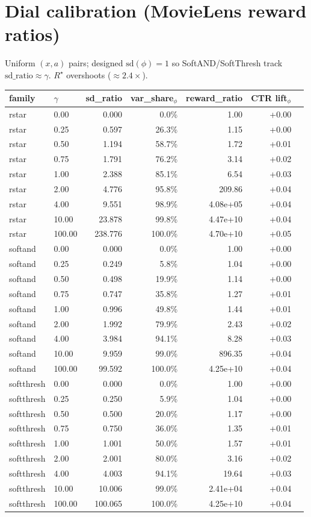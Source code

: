\documentclass[10pt,a4paper]{article}
\begin{document}
\section{Dial calibration (MovieLens reward ratios)}
Uniform $(x,a)$ pairs; designed $\mathrm{sd}(\phi)=1$ so SoftAND/SoftThresh track $\mathrm{sd\_ratio}\approx\gamma$. $R^\star$ overshoots ($\approx 2.4\times$).
\begin{center}\small\begin{tabular}{llrrrrr}
\toprule family & $\gamma$ & sd\_ratio & var\_share$_\phi$ & reward\_ratio & CTR lift$_\phi$ \\
\midrule
rstar & 0.00 & 0.000 & 0.0\% & 1.00 & +0.00 \\
rstar & 0.25 & 0.597 & 26.3\% & 1.15 & +0.00 \\
rstar & 0.50 & 1.194 & 58.7\% & 1.72 & +0.01 \\
rstar & 0.75 & 1.791 & 76.2\% & 3.14 & +0.02 \\
rstar & 1.00 & 2.388 & 85.1\% & 6.54 & +0.03 \\
rstar & 2.00 & 4.776 & 95.8\% & 209.86 & +0.04 \\
rstar & 4.00 & 9.551 & 98.9\% & 4.08e+05 & +0.04 \\
rstar & 10.00 & 23.878 & 99.8\% & 4.47e+10 & +0.04 \\
rstar & 100.00 & 238.776 & 100.0\% & 4.70e+10 & +0.05 \\
softand & 0.00 & 0.000 & 0.0\% & 1.00 & +0.00 \\
softand & 0.25 & 0.249 & 5.8\% & 1.04 & +0.00 \\
softand & 0.50 & 0.498 & 19.9\% & 1.14 & +0.00 \\
softand & 0.75 & 0.747 & 35.8\% & 1.27 & +0.01 \\
softand & 1.00 & 0.996 & 49.8\% & 1.44 & +0.01 \\
softand & 2.00 & 1.992 & 79.9\% & 2.43 & +0.02 \\
softand & 4.00 & 3.984 & 94.1\% & 8.28 & +0.03 \\
softand & 10.00 & 9.959 & 99.0\% & 896.35 & +0.04 \\
softand & 100.00 & 99.592 & 100.0\% & 4.25e+10 & +0.04 \\
softthresh & 0.00 & 0.000 & 0.0\% & 1.00 & +0.00 \\
softthresh & 0.25 & 0.250 & 5.9\% & 1.04 & +0.00 \\
softthresh & 0.50 & 0.500 & 20.0\% & 1.17 & +0.00 \\
softthresh & 0.75 & 0.750 & 36.0\% & 1.35 & +0.01 \\
softthresh & 1.00 & 1.001 & 50.0\% & 1.57 & +0.01 \\
softthresh & 2.00 & 2.001 & 80.0\% & 3.16 & +0.02 \\
softthresh & 4.00 & 4.003 & 94.1\% & 19.64 & +0.03 \\
softthresh & 10.00 & 10.006 & 99.0\% & 2.41e+04 & +0.04 \\
softthresh & 100.00 & 100.065 & 100.0\% & 4.25e+10 & +0.04 \\
\bottomrule
\end{tabular}\end{center}
\end{document}
